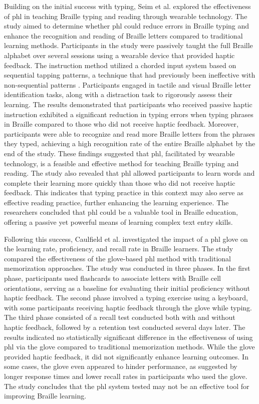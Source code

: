 Building on the initial success with typing, Seim et al. \cite{Seim2014a} explored the effectiveness of \gls{phl} in teaching Braille typing and reading through wearable technology. The study aimed to determine whether \gls{phl} could reduce errors in Braille typing and enhance the recognition and reading of Braille letters compared to traditional learning methods.
Participants in the study were passively taught the full Braille alphabet over several sessions using a wearable device that provided haptic feedback. The instruction method utilized a chorded input system based on sequential tapping patterns, a technique that had previously been ineffective with non-sequential patterns \cite{Seim2014a}. Participants engaged in tactile and visual Braille letter identification tasks, along with a distraction task to rigorously assess their learning.
The results demonstrated that participants who received passive haptic instruction exhibited a significant reduction in typing errors when typing phrases in Braille compared to those who did not receive haptic feedback. Moreover, participants were able to recognize and read more Braille letters from the phrases they typed, achieving a high recognition rate of the entire Braille alphabet by the end of the study. These findings suggested that \gls{phl}, facilitated by wearable technology, is a feasible and effective method for teaching Braille typing and reading.
The study also revealed that \gls{phl} allowed participants to learn words and complete their learning more quickly than those who did not receive haptic feedback. This indicates that typing practice in this context may also serve as effective reading practice, further enhancing the learning experience. The researchers concluded that \gls{phl} could be a valuable tool in Braille education, offering a passive yet powerful means of learning complex text entry skills.

Following this success, Caulfield et al. \cite{Learning2024} investigated the impact of a \gls{phl} glove on the learning rate, proficiency, and recall rate in Braille learners. The study compared the effectiveness of the glove-based \gls{phl} method with traditional memorization approaches.
The study was conducted in three phases. In the first phase, participants used flashcards to associate letters with Braille cell orientations, serving as a baseline for evaluating their initial proficiency without haptic feedback. The second phase involved a typing exercise using a keyboard, with some participants receiving haptic feedback through the glove while typing. The third phase consisted of a recall test conducted both with and without haptic feedback, followed by a retention test conducted several days later.
The results indicated no statistically significant difference in the effectiveness of using \gls{phl} via the glove compared to traditional memorization methods. While the glove provided haptic feedback, it did not significantly enhance learning outcomes. In some cases, the glove even appeared to hinder performance, as suggested by longer response times and lower recall rates in participants who used the glove. The study concludes that the \gls{phl} system tested may not be an effective tool for improving Braille learning.

